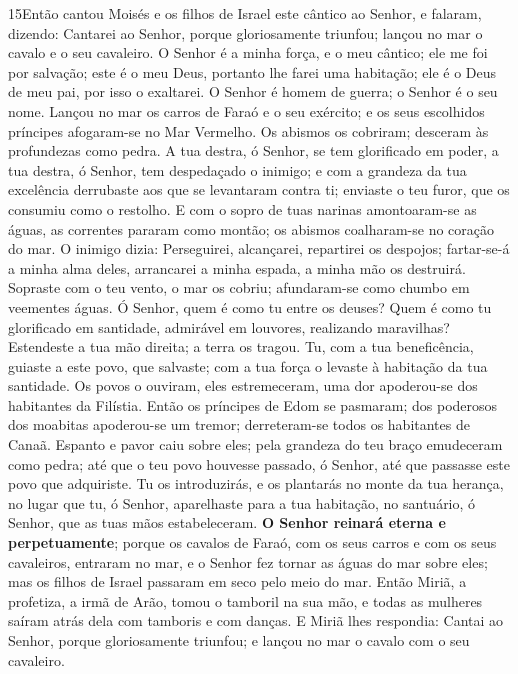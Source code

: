 \medskip

\lettrine{15} Então cantou Moisés e os filhos de Israel este
cântico ao Senhor, e falaram, dizendo: Cantarei ao Senhor, porque
gloriosamente triunfou; lançou no mar o cavalo e o seu cavaleiro.
O Senhor é a minha força, e o meu cântico; ele me foi por
salvação; este é o meu Deus, portanto lhe farei uma habitação; ele é
o Deus de meu pai, por isso o exaltarei. O Senhor é homem de
guerra; o Senhor é o seu nome. Lançou no mar os carros de Faraó
e o seu exército; e os seus escolhidos príncipes afogaram-se no Mar
Vermelho. Os abismos os cobriram; desceram às profundezas como
pedra. A tua destra, ó Senhor, se tem glorificado em poder, a
tua destra, ó Senhor, tem despedaçado o inimigo; e com a
grandeza da tua excelência derrubaste aos que se levantaram contra
ti; enviaste o teu furor, que os consumiu como o restolho. E com
o sopro de tuas narinas amontoaram-se as águas, as correntes pararam
como montão; os abismos coalharam-se no coração do mar. O
inimigo dizia: Perseguirei, alcançarei, repartirei os despojos;
fartar-se-á a minha alma deles, arrancarei a minha espada, a minha
mão os destruirá. Sopraste com o teu vento, o mar os cobriu;
afundaram-se como chumbo em veementes águas. Ó Senhor, quem é
como tu entre os deuses? Quem é como tu glorificado em santidade,
admirável em louvores, realizando maravilhas? Estendeste a
tua mão direita; a terra os tragou. Tu, com a tua
beneficência, guiaste a este povo, que salvaste; com a tua força o
levaste à habitação da tua santidade. Os povos o ouviram,
eles estremeceram, uma dor apoderou-se dos habitantes da Filístia.
Então os príncipes de Edom se pasmaram; dos poderosos dos
moabitas apoderou-se um tremor; derreteram-se todos os habitantes de
Canaã. Espanto e pavor caiu sobre eles; pela grandeza do teu
braço emudeceram como pedra; até que o teu povo houvesse passado, ó
Senhor, até que passasse este povo que adquiriste. Tu os
introduzirás, e os plantarás no monte da tua herança, no lugar que
tu, ó Senhor, aparelhaste para a tua habitação, no santuário, ó
Senhor, que as tuas mãos estabeleceram. \textbf{O Senhor
reinará eterna e perpetuamente}; porque os cavalos de Faraó,
com os seus carros e com os seus cavaleiros, entraram no mar, e o
Senhor fez tornar as águas do mar sobre eles; mas os filhos de
Israel passaram em seco pelo meio do mar. Então Miriã, a
profetiza, a irmã de Arão, tomou o tamboril na sua mão, e todas as
mulheres saíram atrás dela com tamboris e com danças. E Miriã
lhes respondia: Cantai ao Senhor, porque gloriosamente triunfou; e
lançou no mar o cavalo com o seu cavaleiro.

